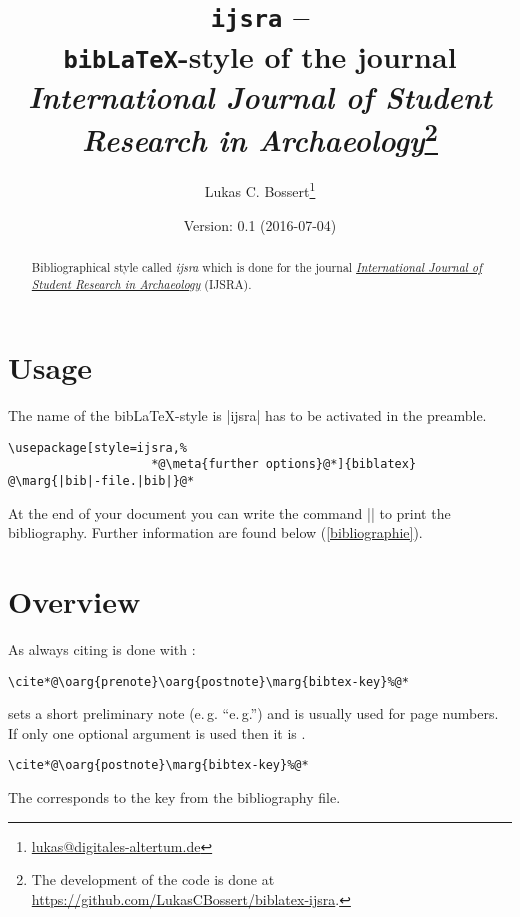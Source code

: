 \documentclass[a4paper,
10pt,
english
]{ltxdoc}
\begin{document}
\title{\texttt{ijsra} -- \\\texttt{bib\LaTeX}-style of the journal \emph{International Journal of Student Research in Archaeology}\footnote{The development of the code is done at \url{https://github.com/LukasCBossert/biblatex-ijsra}.}}
\author{Lukas C. Bossert\thanks{\href{mailto:lukas@digitales-altertum.de}{lukas@digitales-altertum.de}}}
\date{Version: 0.1 (2016-07-04)}
 \maketitle
\begin{abstract}
Bibliographical style called \emph{ijsra} which is done for the journal \href{http://www.ijsra.org}{\emph{International Journal of Student Research in Archaeology}} (IJSRA).
 \end{abstract}



\section{Usage}
   The name of the bib\LaTeX-style is  |ijsra| has to be activated in the preamble. 

\begin{lstlisting}
\usepackage[style=ijsra,%
					*@\meta{further options}@*]{biblatex}
@\marg{|bib|-file.|bib|}@*
\end{lstlisting}


At the end of your document you can write the command |\printbibliography| to print 
the bibliography. 
Further information are found below   (\cref{bibliographie}).

\section{Overview}\label{overview}

\DescribeMacro{\cite}%
As always citing is done with :
\begin{lstlisting}
\cite*@\oarg{prenote}\oarg{postnote}\marg{bibtex-key}%@*
\end{lstlisting}

 sets a short preliminary note (e.\,g. \enquote{e.\,g.}) and  is usually used for page numbers.
If only one optional argument is used then it is .
\begin{lstlisting}
\cite*@\oarg{postnote}\marg{bibtex-key}%@*
\end{lstlisting}
The  corresponds to the key from the bibliography file.
\end{document}
